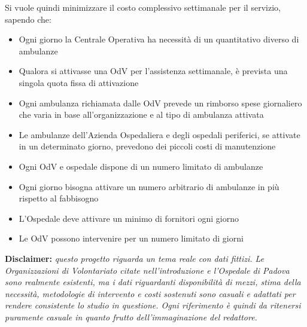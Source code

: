 \newline \newline
Si vuole quindi minimizzare il costo complessivo settimanale per il servizio, sapendo che:
\begin{itemize}
    \item Ogni giorno la Centrale Operativa ha necessità di un quantitativo diverso di ambulanze
    \item Qualora si attivasse una OdV per l'assistenza settimanale, è prevista una singola quota fissa di attivazione
    \item Ogni ambulanza richiamata dalle OdV prevede un rimborso spese giornaliero che varia in base all'organizzazione e al tipo di ambulanza attivata
    \item Le ambulanze dell'Azienda Ospedaliera e degli ospedali periferici, se attivate in un determinato giorno, prevedono dei piccoli costi di manutenzione
    \item Ogni OdV e ospedale dispone di un numero limitato di ambulanze
    \item Ogni giorno bisogna attivare un numero arbitrario di ambulanze in più rispetto al fabbisogno
    \item L'Ospedale deve attivare un minimo di fornitori ogni giorno
    \item Le OdV possono intervenire per un numero limitato di giorni
\end{itemize}
\vspace*{3 cm}
\textbf{Disclaimer: } \textit{questo progetto riguarda un tema reale con dati fittizi. Le Organizzazioni di Volontariato citate nell'introduzione e l'Ospedale di Padova sono realmente esistenti, ma i dati riguardanti disponibilità di mezzi, stima della necessità, metodologie di intervento e costi sostenuti sono casuali e adattati per rendere consistente lo studio in questione. Ogni riferimento è quindi da ritenersi puramente casuale in quanto frutto dell'immaginazione del redattore.}